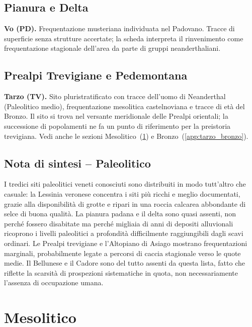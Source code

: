 \subsection{Pianura e Delta}

\textbf{Vo (PD).} Frequentazione musteriana individuata nel Padovano. Tracce di superficie senza strutture accertate; la scheda interpreta il rinvenimento come frequentazione stagionale dell'area da parte di gruppi neanderthaliani.

\subsection{Prealpi Trevigiane e Pedemontana}

\textbf{Tarzo (TV).} \label{app:tarzo_paleo} Sito pluristratificato con tracce dell'uomo di Neanderthal (Paleolitico medio), frequentazione mesolitica castelnoviana e tracce di età del Bronzo. Il sito si trova nel versante meridionale delle Prealpi orientali; la successione di popolamenti ne fa un punto di riferimento per la preistoria trevigiana. Vedi anche le sezioni Mesolitico~(\ref{app:mesolitico}) e Bronzo~(\ref{app:tarzo_bronzo}).

\subsection*{Nota di sintesi -- Paleolitico}

I tredici siti paleolitici veneti conosciuti sono distribuiti in modo tutt'altro che casuale: la Lessinia veronese concentra i siti più ricchi e meglio documentati, grazie alla disponibilità di grotte e ripari in una roccia calcarea abbondante di selce di buona qualità. La pianura padana e il delta sono quasi assenti, non perché fossero disabitate ma perché migliaia di anni di depositi alluvionali ricoprono i livelli paleolitici a profondità difficilmente raggiungibili dagli scavi ordinari. Le Prealpi trevigiane e l'Altopiano di Asiago mostrano frequentazioni marginali, probabilmente legate a percorsi di caccia stagionale verso le quote medie. Il Bellunese e il Cadore sono del tutto assenti da questa lista, fatto che riflette la scarsità di prospezioni sistematiche in quota, non necessariamente l'assenza di occupazione umana.

\section{Mesolitico}
\label{app:mesolitico}

